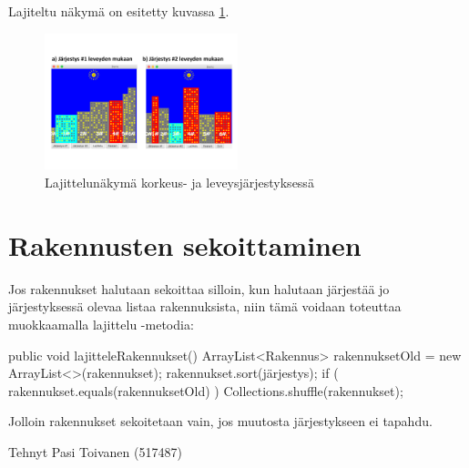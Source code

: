 Lajiteltu näkymä on esitetty kuvassa \ref{Gorillalajitelma}.

\begin{figure}
\centering \includegraphics[width=0.5\textwidth]{kuvat/Gorillamaisema}
\caption{Lajittelunäkymä korkeus- ja leveysjärjestyksessä}
\label{Gorillalajitelma} 
\end{figure}

\section{Rakennusten sekoittaminen}

\label{}

Jos rakennukset halutaan sekoittaa silloin, kun halutaan järjestää jo
järjestyksessä olevaa listaa rakennuksista, niin tämä voidaan toteuttaa
muokkaamalla lajittelu -metodia:

\begin{javacode}
public void lajitteleRakennukset() {
	ArrayList<Rakennus> rakennuksetOld = new ArrayList<>(rakennukset);
	rakennukset.sort(järjestys);
	if ( rakennukset.equals(rakennuksetOld) ) {
		Collections.shuffle(rakennukset);
	}
}
\end{javacode}

Jolloin rakennukset sekoitetaan vain, jos muutosta järjestykseen ei tapahdu.

Tehnyt Pasi Toivanen (517487)

